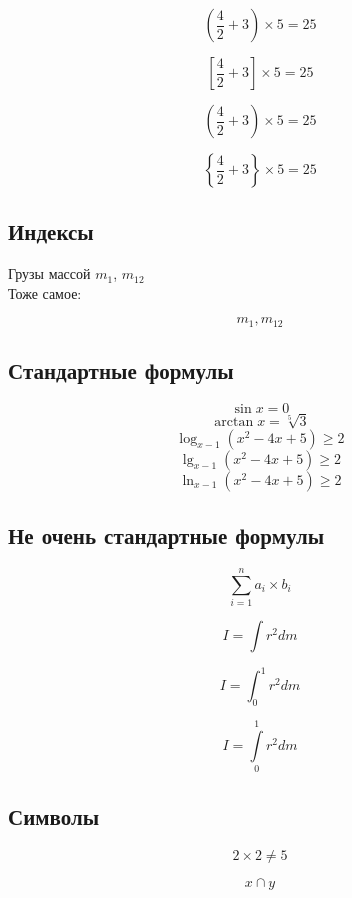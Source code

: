 \documentclass[a4paper,12pt]{article}
\begin{document}
\[ (\frac{4}{2}+3)\times 5=25 \]

\[ \left[\frac{4}{2}+3\right]\times 5 =25 \]

\[ \left(\frac{4}{2}+3\right)\times 5 =25 \]

\[ \left\{\frac{4}{2}+3\right\}\times 5 =25 \]


\subsection{Индексы}

Грузы массой $m_1$, $m_{12}$ \\
Тоже самое:

\[ m_1, m_{12} \]

\subsection{Стандартные формулы}

\[ \sin x=0 \]
\[ \arctan x=\sqrt[5]{3} \]
\[ \log_{x-1}{(x^2-4x+5)} \geqslant 2\]
\[ \lg_{x-1}{(x^2-4x+5)} \geqslant 2\]
\[ \ln_{x-1}{(x^2-4x+5)} \geqslant 2\]

\subsection{Не очень стандартные формулы}

\[\sum_{i=1}^{n}a_i \times b_i \]

\[I = \int r^2dm \]

\[I = \int_{0}^{1} r^2dm \]

\[I = \int\limits_{0}^{1} r^2dm \]

\subsection{Символы}

\[2\times 2\neq 5 \]

\[x \cap y \]
\end{document}
